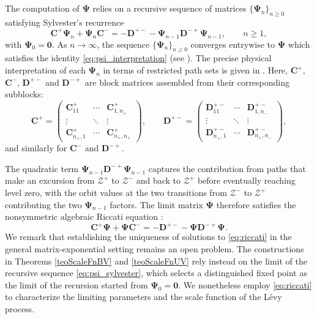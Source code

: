 \documentclass[a4paper,11pt]{article}
\numberwithin{equation}{section}
\theoremstyle{plain}
\theoremstyle{definition}
\newcommand{\1}{\mathbf{1}}
\begin{document}
The computation of $\bm{\Psi}$ relies on a recursive sequence of matrices $\{\bm{\Psi}_n\}_{n \ge 0}$ satisfying Sylvester's recurrence
\begin{equation}\label{eq:psi_sylvester}
\bm{C}^+\bm{\Psi}_n + \bm{\Psi}_n \bm{C}^- 
= -\bm{D}^{+-} - \bm{\Psi}_{n-1}\bm{D}^{-+}\bm{\Psi}_{n-1},
\qquad n\ge 1,
\end{equation}
with $\bm{\Psi}_0 = \bm{0}$. 
As $n \to \infty$, the sequence $\{\bm{\Psi}_n\}_{n\ge 0}$ converges entrywise to $\bm{\Psi}$ which satisfies the identity \eqref{eq:psi_interpretation} (see \cite[Section 4.1]{BeanNguyenNielsenPeralta2022}).
The precise physical interpretation of each $\bm{\Psi}_n$ in terms of restricted path sets is given in \cite[Theorem 4.1]{BeanNguyenNielsenPeralta2022}.
Here, $\bm{C}^+$, $\bm{C}^-$, $\bm{D}^{+-}$ and $\bm{D}^{-+}$ are block matrices assembled from their corresponding subblocks:
\begin{equation}\label{eq:block_matrices}
\bm{C}^+ = 
\begin{pmatrix}
\bm{C}_{11}^+ & \cdots & \bm{C}_{1,n_+}^+\\
\vdots & \ddots & \vdots\\
\bm{C}_{n_+,1}^+ & \cdots & \bm{C}_{n_+,n_+}^+
\end{pmatrix},
\qquad
\bm{D}^{+-} = 
\begin{pmatrix}
\bm{D}_{11}^{+-} & \cdots & \bm{D}_{1,n_-}^{+-}\\
\vdots & \ddots & \vdots\\
\bm{D}_{n_+,1}^{+-} & \cdots & \bm{D}_{n_+,n_-}^{+-}
\end{pmatrix},
\end{equation}
and similarly for $\bm{C}^-$ and $\bm{D}^{-+}$. 

The quadratic term $\bm{\Psi}_{n-1}\bm{D}^{-+}\bm{\Psi}_{n-1}$ captures the contribution from paths that make an excursion from $\mathcal{Z}^+$ to $\mathcal{Z}^-$ and back to $\mathcal{Z}^+$ before eventually reaching level zero, with the orbit values at the two transitions from $\mathcal{Z}^-$ to $\mathcal{Z}^+$ contributing the two $\bm{\Psi}_{n-1}$ factors. The limit matrix $\bm{\Psi}$ therefore satisfies the nonsymmetric algebraic Riccati equation \citep[Corollary 4.2]{BeanNguyenNielsenPeralta2022}:
\begin{equation}\label{eq:riccati}
    \bm{C}^+ \bm{\Psi} + \bm{\Psi} \bm{C}^- = -\bm{D}^{+-} - \bm{\Psi} \bm{D}^{-+} \bm{\Psi}.
\end{equation}
We remark that establishing the uniqueness of solutions to \eqref{eq:riccati} in the general matrix-exponential setting remains an open problem. The constructions in Theorems \ref{teoScaleFnBV} and \ref{teoScaleFnUV} rely instead on the limit of the recursive sequence \eqref{eq:psi_sylvester}, which selects a distinguished fixed point as the limit of the recursion started from $\bm{\Psi}_0=\bm{0}$. We nonetheless employ \eqref{eq:riccati} to characterize the limiting parameters and the scale function of the L\'evy process.
\end{document}
